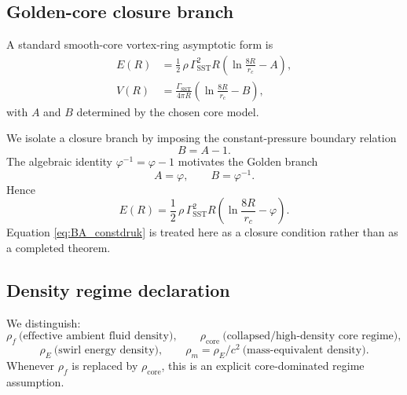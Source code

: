 \documentclass[11pt]{article}
\newcommand{\rc}{r_c}                                    %
\begin{document}
    \subsection{Golden-core closure branch}
        A standard smooth-core vortex-ring asymptotic form is
        \begin{align}
            E(R) &= \frac{1}{2}\,\rho\,\Gamma_{\text{SST}}^2 R
            \left(\ln \frac{8R}{\rc} - A \right), \\
            V(R) &= \frac{\Gamma_{\text{SST}}}{4\pi R}
            \left(\ln \frac{8R}{\rc} - B \right),
        \end{align}
        with \(A\) and \(B\) determined by the chosen core model.
        
        We isolate a closure branch by imposing the constant-pressure boundary relation
        \begin{equation}
            B = A - 1.
            \label{eq:BA_constdruk}
        \end{equation}
        The algebraic identity \(\varphi^{-1}=\varphi-1\) motivates the Golden branch
        \begin{equation}
            A=\varphi,\qquad B=\varphi^{-1}.
            \label{eq:goldenAB}
        \end{equation}
        Hence
        \begin{equation}
            E(R)=\frac{1}{2}\,\rho\,\Gamma_{\text{SST}}^2 R
            \left(\ln \frac{8R}{\rc} - \varphi \right).
            \label{eq:golden-energy}
        \end{equation}
        Equation \eqref{eq:BA_constdruk} is treated here as a closure condition rather than as a completed theorem.
    
    \subsection{Density regime declaration}
        We distinguish:
        \[
            \rho_{\!f}\ \text{(effective ambient fluid density)},\qquad
            \rho_{\text{core}}\ \text{(collapsed/high-density core regime)},
        \]
        \[
            \rho_{\!E}\ \text{(swirl energy density)},\qquad
            \rho_{\!m}=\rho_{\!E}/c^2\ \text{(mass-equivalent density)}.
        \]
        Whenever \(\rho_{\!f}\) is replaced by \(\rho_{\text{core}}\), this is an explicit core-dominated regime assumption.
    
\end{document}
